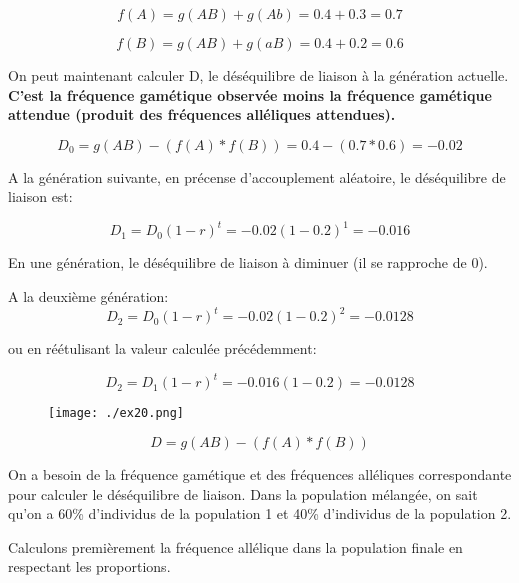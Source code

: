 \documentclass{article}
\begin{document}
\begin{equation}
f(A) = g(AB) + g(Ab) = 0.4 + 0.3 = 0.7
\end{equation}

\begin{equation}
f(B) = g(AB) + g(aB) = 0.4 + 0.2 = 0.6
\end{equation}

On peut maintenant calculer D, le déséquilibre de liaison à la génération actuelle. \textbf{C'est la fréquence gamétique observée moins la fréquence gamétique attendue (produit des fréquences alléliques attendues).}

\begin{equation}
D_0 = g(AB) - (f(A) * f(B)) = 0.4 - (0.7*0.6) = -0.02
\end{equation}

A la génération suivante, en précense d'accouplement aléatoire, le déséquilibre de liaison est:

\begin{equation}
D_1 = D_0(1-r)^t = -0.02(1-0.2)^1 = -0.016
\end{equation}

En une génération, le déséquilibre de liaison à diminuer (il se rapproche de 0).

A la deuxième génération:
\begin{equation}
D_2 = D_0(1-r)^t = -0.02(1-0.2)^2 = -0.0128
\end{equation}

ou en réétulisant la valeur calculée précédemment:

\begin{equation}
D_2 = D_1(1-r)^t = -0.016(1-0.2) = -0.0128
\end{equation}

\pagebreak

\begin{figure}[H]
\texttt{[image: ./ex20.png]}
\end{figure}


\begin{equation}
D = g(AB) - (f(A)*f(B))
\end{equation}

On a besoin de la fréquence gamétique et des fréquences alléliques correspondante pour calculer le déséquilibre de liaison. Dans la population mélangée, on sait qu'on a 60\% d'individus de la population 1 et 40\% d'individus de la population 2.

Calculons premièrement la fréquence allélique dans la population finale en respectant les proportions.
\end{document}
